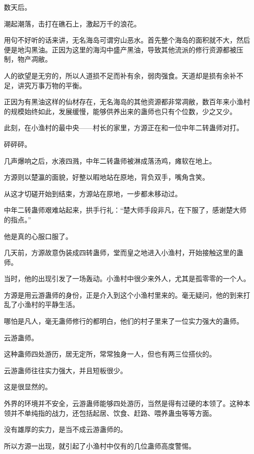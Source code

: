 
\begin{this_body}

数天后。

潮起潮落，击打在礁石上，激起万千的浪花。

用句不好听的话来讲，无名海岛可谓穷山恶水。首先整个海岛的面积就不大，然后便是地沟黑油。正因为这里的海沟中盛产黑油，导致其他流派的修行资源都被压制，物产凋敝。

人的欲望是无穷的，所以人道损不足而补有余，弱肉强食。天道却是损有余补不足，讲究万事万物的平衡。

正因为有黑油这样的仙材存在，无名海岛的其他资源都非常凋敝，数百年来小渔村的规模始终如此，发展缓慢，能够供养出来的蛊师也只有个位数，少之又少。

此刻，在小渔村的最中央——村长的家里，方源正在和一位中年二转蛊师对打。

砰砰砰。

几声爆响之后，水液四溅，中年二转蛊师被淋成落汤鸡，瘫软在地上。

方源则以楚瀛的面貌，好整以暇地站在原地，背负双手，嘴角含笑。

从这才切磋开始到结束，方源站在原地，一步都未移动过。

中年二转蛊师艰难站起来，拱手行礼：“楚大师手段非凡，在下服了，感谢楚大师的指点。”

他是真的心服口服了。

几天前，方源故意伪装成四转蛊师，堂而皇之地进入小渔村，开始接触这里的蛊师。

当时，他的出现引发了一场轰动。小渔村中很少来外人，尤其是孤零零的一个人。

方源是用云游蛊师的身份，正是介入到这个小渔村里来的。毫无疑问，他的到来打乱了小渔村的平静生活。

哪怕是凡人，毫无蛊师修行的都明白，他们的村子里来了一位实力强大的蛊师。

云游蛊师。

这种蛊师四处游历，居无定所，常常独身一人，但也有两三位搭伙的。

云游蛊师往往实力强大，并且短板很少。

这是很显然的。

外界的环境并不安全，云游蛊师能够四处游历，当然是得有过硬的本领了。这种本领并不单纯指的战力，还包括起居、饮食、赶路、喂养蛊虫等等方面。

没有雄厚的实力，是当不成云游蛊师的。

所以方源一出现，就引起了小渔村中仅有的几位蛊师高度警惕。


\end{this_body}
